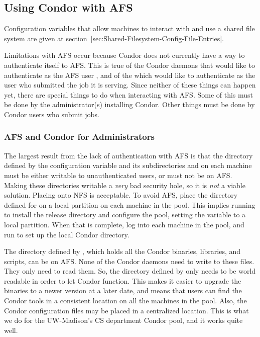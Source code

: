 \subsection{\label{sec:Condor-AFS}Using Condor with AFS}

Configuration variables that allow machines to interact with and
use a shared file system are given at
section~\ref{sec:Shared-Filesystem-Config-File-Entries}.

Limitations with AFS occur because
 Condor does not currently have a way to authenticate itself to AFS.
This is true of the Condor daemons that would like to authenticate as
the AFS user , and of the  which would like to
authenticate as the user who submitted the job it is serving.
Since neither of these things can happen yet, there are special
things to do when interacting with AFS.
Some of this must be done by the administrator(s) installing Condor.
Other things must be done by Condor users who submit jobs.

\subsubsection{\label{sec:Condor-AFS-Admin}AFS and Condor for Administrators}

The largest result from the lack of authentication with AFS is that
the directory defined by the configuration variable 
and its subdirectories  and  on each machine
must be either writable to unauthenticated users, or must not be on AFS.
Making these directories writable a \emph{very} bad security hole,
so it is \emph{not} a viable solution.
Placing  onto NFS is acceptable.
To avoid AFS, place the directory defined for  on
a local partition on each machine in the pool.
This implies running  to install the release directory and
configure the pool,
setting the  variable to a local partition.
When that is complete, log into each machine in the pool,
and run  to set up the local Condor directory.

The directory defined by ,
which holds all the Condor binaries,
libraries, and scripts, can be on AFS.
None of the Condor daemons need to write to these files.
They only need to read them.
So, the directory defined by  only needs to be
world readable in order to let Condor function.
This makes it easier to
upgrade the binaries to a newer version at a later date,
and means that users can find the Condor tools in a consistent location
on all the machines in the pool. 
Also, the Condor configuration files may be placed in a centralized location.
This is what we do for the UW-Madison's CS department Condor pool,
and it works quite well.

